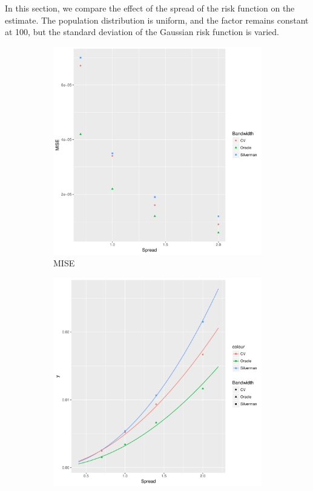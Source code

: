 In this section, we compare the effect of the \gls{spread} of the risk function on the estimate.
The population distribution is uniform, and the \gls{factor} remains constant at 100, but
the standard deviation of the Gaussian risk function is varied.

\begin{figure}[htbp]
    \centering
    \begin{subfigure}[b]{0.3\textwidth}
    \includegraphics[width=\textwidth]{results/by_cases_spread/MISE-vs-risk-spread}
    \caption{MISE}
    \end{subfigure}
    \begin{subfigure}[b]{0.3\textwidth}
    \includegraphics[width=\textwidth]{results/by_cases_spread/RMISE-vs-risk-spread}

\end{subfigure}
\end{figure}
